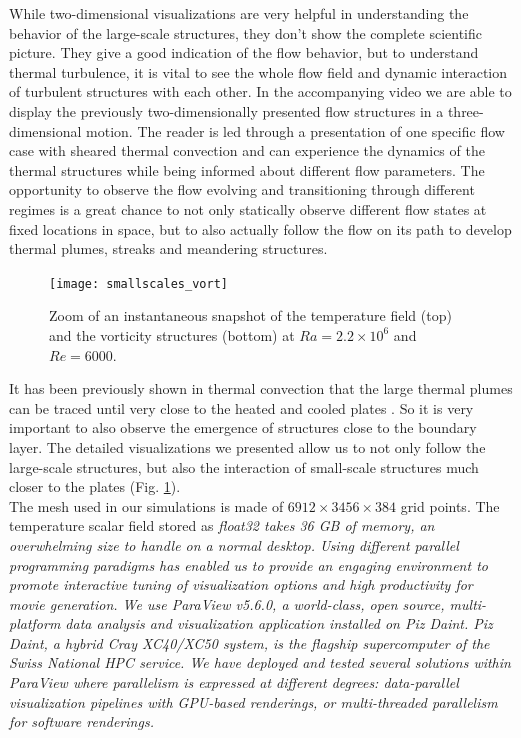 \documentclass[5p,times]{elsarticle}
\begin{document}
While two-dimensional visualizations are very helpful in understanding the behavior of the large-scale structures, they don't show the complete scientific picture. They give a good indication of the flow behavior, but to understand thermal turbulence, it is vital to see the whole flow field and dynamic interaction of turbulent structures with each other.
In the accompanying video we are able to display the previously two-dimensionally presented flow structures in a three-dimensional motion. The reader is led through a presentation of one specific flow case with sheared thermal convection and can experience the dynamics of the thermal structures while being informed about different flow parameters. The opportunity to observe the flow evolving and transitioning through different regimes is a great chance to not only statically observe different flow states at fixed locations in space, but to also actually follow the flow on its path to develop thermal plumes, streaks and meandering structures.


\begin{figure}
	\centering
	\texttt{[image: smallscales\_vort]}%
	\caption{\label{fig:smallscale} Zoom of an instantaneous snapshot of the temperature field (top) and the vorticity structures (bottom) at $ Ra=2.2 \times 10^6 $ and $ Re=6000 $.}
\end{figure}

It has been previously shown in thermal convection that the large thermal plumes can be traced until very close to the heated and cooled plates \cite{ste18}. So it is very important to also observe the emergence of structures close to the boundary layer. The detailed visualizations we presented allow us to not only follow the large-scale structures, but also the interaction of small-scale structures much closer to the plates (Fig. \ref{fig:smallscale}).\\

The mesh used in our simulations is made of $ 6912 \times 3456 \times 384 $ grid points.
The temperature scalar field stored as \it{float32} \rm takes 36 GB of memory, an
overwhelming size to handle on a normal desktop. Using different parallel programming
paradigms has enabled us to provide an engaging environment
to promote interactive tuning of visualization options and high productivity for movie
generation. We use ParaView v5.6.0, a world-class, open source, multi-platform data analysis and
visualization application installed on Piz Daint. Piz Daint, a hybrid Cray XC40/XC50 system,
is the flagship supercomputer of the Swiss National HPC service. We have deployed
and tested several solutions within ParaView where parallelism is expressed
at different degrees: data-parallel visualization pipelines with GPU-based renderings,
or multi-threaded parallelism for software renderings.
\end{document}
